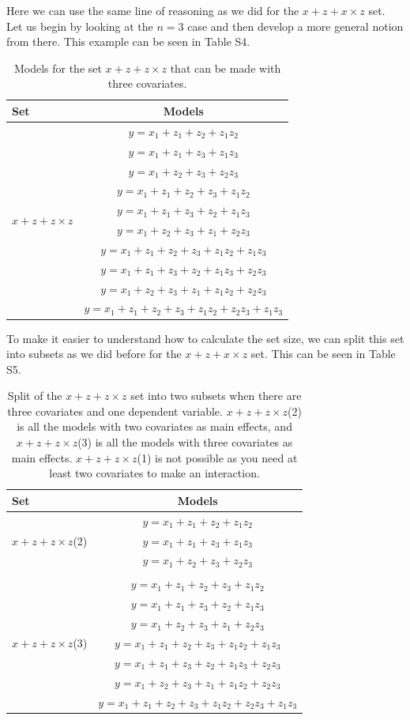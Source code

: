Here we can use the same line of reasoning as we did for the $x + z + x \times z$ set. Let us begin by looking at the $n=3$ case and then develop a more general notion from there. This example can be seen in Table S4. 
\begin{table}{}
\centering
\caption{Models for the set $x + z + z \times z$ that can be made with three covariates.}
\begin{tabular}{lc} \hline
\toprule
Set & Models \\
\midrule
\multirow{10}{*}{$x + z + z \times z$} & $y=x_1+z_1+z_2+z_1z_2$\\ & $y=x_1+z_1+z_3+z_1z_3$\\ & $y=x_1+z_2+z_3+z_2z_3$\\ & $y=x_1+z_1+z_2+z_3+z_1z_2$\\ & $y=x_1+z_1+z_3+z_2+z_1z_3$\\ & $y=x_1+z_2+z_3+z_1+z_2z_3$\\ & $y=x_1+z_1+z_2+z_3+z_1z_2+z_1z_3$\\ & $y=x_1+z_1+z_3+z_2+z_1z_3+z_2z_3$\\ & $y=x_1+z_2+z_3+z_1+z_1z_2+z_2z_3$\\ & $y=x_1+z_1+z_2+z_3+z_1z_2+z_2z_3+z_1z_3$ \\
\bottomrule
\end{tabular}
\end{table}
To make it easier to understand how to calculate the set size, we can split this set into subsets as we did before for the $x + z + x \times z$ set. This can be seen in Table S5.

\begin{table}
\centering
\caption{Split of the $x + z + z \times z$ set into two subsets when there are three covariates and one dependent variable. $x + z + z \times z$(2) is all the models with two covariates as main effects, and $x + z + z \times z$(3) is all the models with three covariates as main effects. $x + z + z \times z$(1) is not possible as you need at least two covariates to make an interaction.}
\begin{tabular}{lc} 
\toprule
Set & Models \\ 
\midrule
\multirow{3}{*}{$x + z + z \times z$(2)} & $y=x_1+z_1+z_2+z_1z_2$\\ & $y=x_1+z_1+z_3+z_1z_3$\\ & $y=x_1+z_2+z_3+z_2z_3$\\ &  \\  
\multirow{7}{*}{$x + z + z \times z$(3)} & $y=x_1+z_1+z_2+z_3+z_1z_2$\\ & $y=x_1+z_1+z_3+z_2+z_1z_3$\\ & $y=x_1+z_2+z_3+z_1+z_2z_3$\\ & $y=x_1+z_1+z_2+z_3+z_1z_2+z_1z_3$\\ & $y=x_1+z_1+z_3+z_2+z_1z_3+z_2z_3$\\ & $y=x_1+z_2+z_3+z_1+z_1z_2+z_2z_3$\\ & $y=x_1+z_1+z_2+z_3+z_1z_2+z_2z_3+z_1z_3$\\ 
\bottomrule
\end{tabular}
\end{table}

